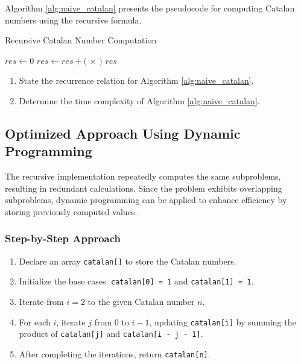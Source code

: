 \documentclass[12pt]{article}
\begin{document}
Algorithm \ref{alg:naive_catalan} presents the pseudocode for computing Catalan numbers using the recursive formula.

\begin{algorithm}
\caption{Recursive Catalan Number Computation}
\label{alg:naive_catalan}
\begin{algorithmic}[1]
        \State {}
    \EndIf
    \State $res \gets 0$
        \State $res \gets res + ($ $\times$ $)$
    \EndFor
    \State \Return $res$
\EndFunction
\end{algorithmic}
\end{algorithm}

\begin{tcolorbox}[title=Exercises]
    \begin{enumerate}
        \item State the recurrence relation for Algorithm \ref{alg:naive_catalan}.
        \item Determine the time complexity of Algorithm \ref{alg:naive_catalan}.
    \end{enumerate}
\end{tcolorbox}

\subsection{Optimized Approach Using Dynamic Programming}

The recursive implementation repeatedly computes the same subproblems, resulting in redundant calculations. Since the problem exhibits overlapping subproblems, dynamic programming can be applied to enhance efficiency by storing previously computed values.

\subsubsection*{Step-by-Step Approach}

\begin{enumerate}
    \item Declare an array \texttt{catalan[]} to store the Catalan numbers.
    \item Initialize the base cases: \texttt{catalan[0] = 1} and \texttt{catalan[1] = 1}.
    \item Iterate from \( i = 2 \) to the given Catalan number \( n \).
    \item For each \( i \), iterate \( j \) from \( 0 \) to \( i-1 \), updating \texttt{catalan[i]} by summing the product of \texttt{catalan[j]} and \texttt{catalan[i - j - 1]}.
    \item After completing the iterations, return \texttt{catalan[n]}.
\end{enumerate}
\end{document}
